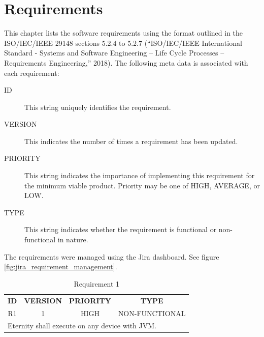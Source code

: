 \documentclass[11pt,a4paper]{report}
\theoremstyle{definition}
\theoremstyle{remark}
\begin{document}
    \chapter{Requirements}
        This chapter lists the software requirements using the format outlined in the ISO/IEC/IEEE 29148 sections 5.2.4 to 5.2.7 (“ISO/IEC/IEEE International Standard - Systems and Software Engineering -- Life Cycle Processes -- Requirements Engineering,” 2018). 
        The following meta data is associated with each requirement:
    
        \begin{description}
            \item[ID] This string uniquely identifies the requirement.
            \item[VERSION] This indicates the number of times a requirement has been updated.
            \item[PRIORITY] This string indicates the importance of implementing this requirement for the minimum viable product. Priority may be one of HIGH, AVERAGE, or LOW.
            \item[TYPE] This string indicates whether the requirement is functional or non-functional in nature.        
        \end{description}
        
        The requirements were managed using the Jira dashboard. See figure \ref{fig:jira_requirement_management}.
        
        \vspace{3em}
    
        \begin{table}[ht]
        \centering
            \begin{tabular}{cccc} %
                \textbf{ID} & \textbf{VERSION} & \textbf{PRIORITY} & \textbf{TYPE}\\
                        R1  &           1      &           HIGH    &      NON-FUNCTIONAL\\
                \hline
                \multicolumn{4}{l}{Eternity shall execute on any device with JVM.}
            \end{tabular}
            \caption{Requirement 1}
            \label{tab:table-requirements-1}
        \end{table}
        \vspace{3em}
        
\end{document}
